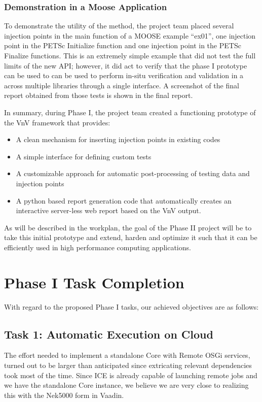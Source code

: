 \begin{itemize}
\subsubsection{ Demonstration in a Moose Application } 
To demonstrate the utility of the method, the project team placed several injection points 
in the main function of a MOOSE example ``ex01'', one injection point in the PETSc Initialize function and 
one injection point in the PETSc Finalize functions. This is an extremely simple example that 
did not test the full limits of the new API; however, it did act to verify that the phase I prototype 
can be used to can be used to perform in-situ verification and validation in a across multiple libraries 
through a single interface. A screenshot of the final \VV report obtained from those tests is shown in the 
final report. 

In summary, during Phase I, the project team created a functioning prototype of the VnV framework that provides:
\begin{itemize}
 \item A clean mechanism for inserting injection points in existing codes
 \item A simple interface for defining custom tests 
 \item A customizable approach for automatic post-processing of testing data and injection points
 \item A python based report generation code that automatically creates an interactive server-less web report based on the VnV output.
\end{itemize}

As will be described in the workplan, the goal of the Phase II project will be to take this initial prototype and extend, harden and 
optimize it such that it can be efficiently used in high performance computing applications. 







\section{Phase I Task Completion}
With regard to the proposed Phase I tasks, our achieved objectives are as 
follows:

\subsection{Task 1: Automatic Execution on Cloud}
The effort needed to implement a standalone Core with Remote OSGi services, 
turned out to be larger than anticipated since extricating relevant 
dependencies took most of the time. Since ICE is already capable of launching 
remote jobs and we have the standalone Core instance, we believe we are very 
close to realizing this with the Nek5000 form in Vaadin.


\end{itemize}
